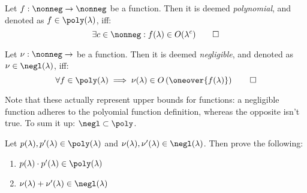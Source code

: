 \begin{definition}
    Let $f : \nonneg \to \nonneg$ be a function. Then it is deemed \emph{polynomial}, and denoted as $f \in \poly(\lambda)$, iff:
    \[
        \exists c \in \nonneg : f(\lambda) \in O(\lambda^c) \qedhere
    \]
\end{definition}

\begin{definition}
    Let $\nu : \nonneg \to \real$ be a function. Then it is deemed \emph{negligible}, and denoted as $\nu \in \negl(\lambda)$, iff:
    \[
        \forall f \in \poly(\lambda)  \implies \nu(\lambda) \in O\left(\oneover{f(\lambda)}\right) \qedhere
    \]
\end{definition}

Note that these actually represent upper bounds for functions: a negligible function adheres to the polyomial function definition, whereas the opposite isn't true. To sum it up: $\negl \subset \poly$.

\begin{exercise}
    Let $p(\lambda), p'(\lambda) \in \poly(\lambda)$ and $\nu(\lambda), \nu'(\lambda) \in \negl(\lambda)$. Then prove the following:

    \begin{enumerate}
        \item $p(\lambda) \cdot p'( \lambda) \in  \poly(\lambda)$
        \item \label{ex:negl} $\nu(\lambda) + \nu'(\lambda) \in \negl(\lambda)$
    \end{enumerate} 
\end{exercise}

